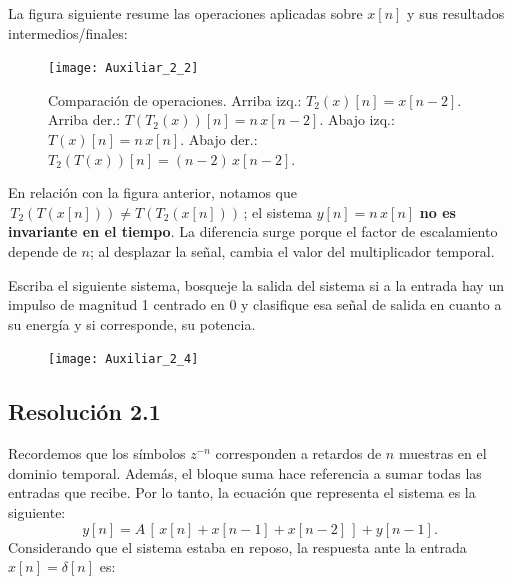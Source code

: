 \documentclass[
  11pt,
  letterpaper,
   addpoints,
   answers
  ]{exam}
\begin{document}
\begin{questions}
\begin{solution}
La figura siguiente resume las operaciones aplicadas sobre $x[n]$ y sus resultados intermedios/finales:

\begin{figure}[H]
  \centering
  \texttt{[image: Auxiliar\_2\_2]}
  \caption{Comparación de operaciones. Arriba izq.: $T_2(x)[n]=x[n-2]$. Arriba der.: $T(T_2(x))[n]=n\,x[n-2]$. Abajo izq.: $T(x)[n]=n\,x[n]$. Abajo der.: $T_2(T(x))[n]=(n-2)\,x[n-2]$.}
\end{figure}

En relación con la figura anterior, notamos que $\,T_2(T(x[n])) \neq T(T_2(x[n]))\,$; el sistema $y[n]=n\,x[n]$ \textbf{no es invariante en el tiempo}. La diferencia surge porque el factor de escalamiento depende de $n$; al desplazar la señal, cambia el valor del multiplicador temporal.
\end{solution}
\question Escriba el siguiente sistema, bosqueje la salida del sistema si a la entrada hay un impulso de magnitud 1 centrado en 0 y clasifique esa señal de salida en cuanto a su energía y si corresponde, su potencia.
\begin{figure}[H]
  \centering
  \texttt{[image: Auxiliar\_2\_4]}
\end{figure}
\begin{solution}
\subsection*{Resolución 2.1}
Recordemos que los símbolos $z^{-n}$ corresponden a retardos de $n$ muestras en el dominio temporal. Además, el bloque suma hace referencia a sumar todas las entradas que recibe. Por lo tanto, la ecuación que representa el sistema es la siguiente:
\begin{equation}
y[n] = A\,[\,x[n] + x[n-1] + x[n-2]\,] + y[n-1].
\end{equation}
Considerando que el sistema estaba en reposo, la respuesta ante la entrada $x[n] = \delta[n]$ es:


\end{solution}
\end{questions}
\end{document}
